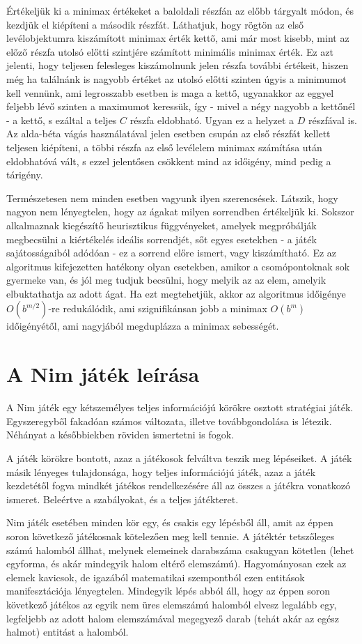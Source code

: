 Értékeljük ki a minimax értékeket a baloldali részfán az előbb tárgyalt módon, és kezdjük el kiépíteni a második részfát. Láthatjuk, hogy rögtön az első levélobjektumra kiszámított minimax érték kettő, ami már most kisebb, mint az előző részfa utolsó előtti szintjére számított minimális minimax érték. Ez azt jelenti, hogy teljesen felesleges kiszámolnunk jelen részfa további értékeit, hiszen még ha találnánk is nagyobb értéket az utolsó előtti szinten úgyis a minimumot kell vennünk, ami legrosszabb esetben is maga a kettő, ugyanakkor az eggyel feljebb lévő szinten a maximumot keressük, így - mivel a négy nagyobb a kettőnél - a kettő, s ezáltal a teljes $C$ részfa eldobható. Ugyan ez a helyzet a $D$ részfával is. Az alda-béta vágás használatával jelen esetben csupán az első részfát kellett teljesen kiépíteni, a többi részfa az első levélelem minimax számítása után eldobhatóvá vált, s ezzel jelentősen csökkent mind az időigény, mind pedig a tárigény.\ujsor

Természetesen nem minden esetben vagyunk ilyen szerencsések. Látszik, hogy nagyon nem lényegtelen, hogy az ágakat milyen sorrendben értékeljük ki. Sokszor alkalmaznak kiegészítő heurisztikus függvényeket, amelyek megpróbálják megbecsülni a kiértékelés ideális sorrendjét, sőt egyes esetekben - a játék sajátosságaiból adódóan - ez a sorrend előre ismert, vagy kiszámítható. Ez az algoritmus kifejezetten hatékony olyan esetekben, amikor a csomópontoknak sok gyermeke van, és jól meg tudjuk becsülni, hogy melyik az az elem, amelyik elbuktathatja az adott ágat. Ha ezt megtehetjük, akkor az algoritmus időigénye $O(b^{m/2})$-re redukálódik, ami szignifikánsan jobb a minimax $O(b^m)$ időigényétől, ami nagyjából megduplázza a minimax sebességét.

\section{A Nim játék leírása}
A Nim játék egy kétszemélyes teljes információjú körökre osztott stratégiai játék. Egyszeregyből fakadóan számos változata, illetve továbbgondolása is létezik. Néhányat a későbbiekben röviden ismertetni is fogok. \ujsor

A játék körökre bontott, azaz a játékosok felváltva teszik meg lépéseiket. A játék másik lényeges tulajdonsága, hogy teljes információjú játék, azaz a játék kezdetétől fogva mindkét játékos rendelkezésére áll az összes a játékra vonatkozó ismeret. Beleértve a szabályokat, és a teljes játékteret.\ujsor

Nim játék esetében minden kör egy, és csakis egy lépésből áll, amit az éppen soron következő játékosnak kötelezően meg kell tennie. A játéktér tetszőleges számú halomból állhat, melynek elemeinek darabszáma csakugyan kötetlen (lehet egyforma, és akár mindegyik halom eltérő elemszámú). Hagyományosan ezek az elemek kavicsok, de igazából matematikai szempontból ezen entitások manifesztációja lényegtelen. Mindegyik lépés abból áll, hogy az éppen soron következő játékos az egyik nem üres elemszámú halomból elvesz legalább egy, legfeljebb az adott halom elemszámával megegyező darab (tehát akár az egész halmot) entitást a halomból.\ujsor

